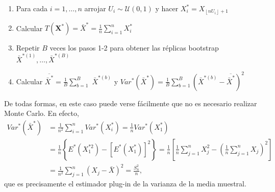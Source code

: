\documentclass[
]{book}
\renewcommand{\mathbf}[1]{\symbf{#1}}
\theoremstyle{break}
\theoremstyle{nonumberplain}
\begin{document}
\begin{enumerate}
\def\labelenumi{\arabic{enumi}.}
\item
  Para cada \(i=1,\ldots ,n\) arrojar \(U_i\sim \mathcal{U}\left( 0,1 \right)\) y
  hacer \(X_i^{\ast}=X_{\left\lfloor nU_i\right\rfloor +1}\)
\item
  Calcular
  \(T\left( \mathbf{X}^{\ast} \right) =\bar{X}^{\ast}=
  \frac{1}{n}\sum_{i=1}^{n}X_i^{\ast}\)
\item
  Repetir \(B\) veces los pasos 1-2 para obtener las réplicas bootstrap
  \(\bar{X}^{\ast (1)}, \ldots, \bar{X}^{\ast
  (B)}\)
\item
  Calcular \(\overline{\bar{X}^{\ast}}=\frac{1}{B}\sum_{b=1}^{B}\)
  \(\bar{X}^{\ast (b)}\) y
  \(Var^{\ast}\left( \bar{X}^{\ast} \right) =\frac{1}{B} \sum_{b=1}^{B}\left( \bar{X}^{\ast (b)}-\overline{\bar{X}^{\ast}} \right)^2\)
\end{enumerate}

De todas formas, en este caso puede verse fácilmente que no es necesario
realizar Monte Carlo. En efecto,
\[\begin{aligned}
Var^{\ast}\left( \bar{X}^{\ast} \right) & = \frac{1}{n^2}
\sum_{i=1}^{n}Var^{\ast}\left( X_i^{\ast} \right) =\frac{1}{n}Var^{\ast}\left( X_1^{\ast} \right) \\
& = \frac{1}{n}\left\{ E^{\ast}\left( X_1^{\ast 2} \right) -
\left[ E^{\ast}\left( X_1^{\ast} \right) \right]^2\right\} =\frac{1}{n}\left[ 
\frac{1}{n}\sum_{j=1}^{n}X_j^2-\left( \frac{1}{n}\sum_{j=1}^{n}X_j \right)^2 \right] \\
& = \frac{1}{n^2}\sum_{j=1}^{n}\left( X_j-\bar{X} \right)^2=\frac{S_n^2}{n},
\end{aligned}\]
que es precisamente el estimador
plug-in de la varianza de la media muestral.
\end{document}

